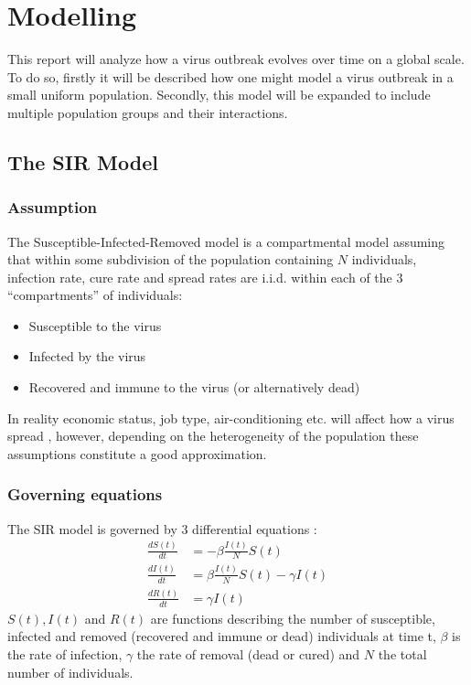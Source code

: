 \section{Modelling}
This report will analyze how a virus outbreak evolves over time on a global scale. To do so, firstly it will be described how one might model a virus outbreak in a small uniform population. Secondly, this model will be expanded to include multiple population groups and their interactions.

\subsection{The SIR Model}
\subsubsection{Assumption}
The Susceptible-Infected-Removed model is a compartmental model assuming that within some subdivision of the population containing $N$ individuals, infection rate, cure rate and spread rates are i.i.d. within each of the 3 ``compartments'' of individuals:
\begin{itemize}
	\item Susceptible to the virus
	\item Infected by the virus
	\item Recovered and immune to the virus (or alternatively dead)
\end{itemize} 
In reality economic status, job type, air-conditioning etc. will affect how a virus spread \cite{zika-modelling}, however, depending on the heterogeneity of the population these assumptions constitute a good approximation.

\subsubsection{Governing equations}
The SIR model is governed by 3 differential equations \cite{sir-basics}:
\begin{align}
\frac{d S(t)}{dt} &= - \beta \frac{I(t)}{N} S(t)   \label{eq-S}\\
\frac{d I(t)}{dt} &= \beta \frac{I(t)}{N} S(t) - \gamma I(t)  \label{eq-I}\\
\frac{d R(t)}{dt} &= \gamma I(t) \label{eq-R}
\end{align}
$S(t), I(t)$ and $R(t)$ are functions describing the number of susceptible, infected and removed (recovered and immune or dead) individuals at time t, $\beta$ is the rate of infection, $\gamma$ the rate of removal (dead or cured) and $N$ the total number of individuals.

